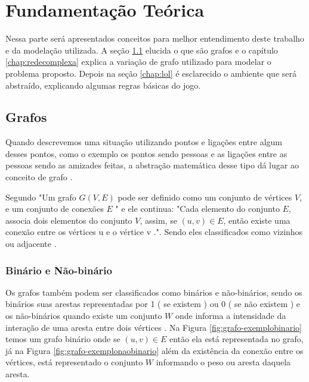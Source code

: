 \chapter{Fundamentação Teórica}
\label{chap:fundteorica}
Nessa parte será apresentados conceitos para melhor entendimento deste trabalho e da modelação utilizada. 
A seção \ref{chap:grafos} elucida o que são grafos e o capítulo \ref{chap:redecomplexa} explica a variação de grafo utilizado para modelar o problema proposto. Depois na seção \ref{chap:lol} é esclarecido o ambiente que será abstraído, explicando algumas regras básicas do jogo.
\section{Grafos}
\label{chap:grafos}

Quando descrevemos uma situação utilizando pontos e ligações entre algum desses pontos, como o exemplo os pontos sendo pessoas e as ligações entre as pessoas sendo as amizades feitas, a abstração matemática desse tipo dá lugar ao conceito de grafo \cite{Lucchesi1979}.

Segundo \citet{Viana2007} "Um grafo \(G(V, E)\) pode ser definido como um conjunto de vértices \(V\), e um conjunto de conexões \(E\) " e ele continua: "Cada elemento do conjunto \(E\), associa dois elementos do conjunto \(V\), assim, se \((u,v) \in E\), então existe uma conexão entre os vértices u e o vértice v .". Sendo eles classificados como vizinhos ou adjacente \cite{grafosucinto}.


\subsection{Binário e Não-binário}
Os grafos também podem ser classificados como binários e não-binários, sendo os binários suas arestas representadas por 1 ( se existem ) ou 0 ( se não existem ) e os não-binários quando existe um conjunto \(W\) onde informa a intensidade da interação de uma aresta entre dois vértices  \cite{Viana2007}.
Na Figura \ref{fig:grafo-exemplobinario} temos um grafo binário onde se \((u,v) \in E\) então ela está representada no grafo, já na Figura \ref{fig:grafo-exemplonaobinario} além da existência da conexão entre os vértices, está representado o conjunto \(W\) informando o peso ou aresta daquela aresta.

